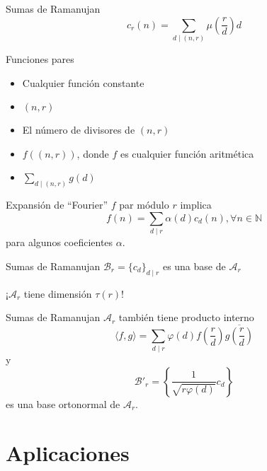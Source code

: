 \documentclass{beamer}
\begin{document}
\begin{frame}{Sumas de Ramanujan}
    \begin{equation*}
        c_r(n) = \sum_{d \mid (n,r)} \mu \left( \frac{r}{d} \right) d
    \end{equation*}
\end{frame}

\begin{frame}{Funciones pares}
    \begin{itemize}
    \item Cualquier función constante
    \item $(n,r)$
    \item El número de divisores de $(n,r)$
    \item $f((n,r))$, donde $f$ es cualquier función aritmética
    \item $\sum_{d \mid (n,r)} g(d)$
    \end{itemize}
\end{frame}

\begin{frame}{Expansión de ``Fourier''}
    $f$ par módulo $r$ implica
    \begin{equation*}
        f(n) = \sum_{d \mid r} \alpha(d) c_d(n), \forall n \in \mathbb{N}
    \end{equation*}
    para algunos coeficientes $\alpha$.
\end{frame}

\begin{frame}{Sumas de Ramanujan}
    \centering
    $\mathcal{B}_r = \{ c_d \}_{d \mid r}$ es una base de $\mathcal{A}_r$

    ¡$\mathcal{A}_r$ tiene dimensión $\tau(r)$!
\end{frame}

\begin{frame}{Sumas de Ramanujan}
    $\mathcal{A}_r$ también tiene producto interno
    \begin{equation*}
        \langle f, g \rangle = \sum_{d \mid r} \varphi(d) f \left( \frac{r}{d} \right) \overline{g \left( \frac{r}{d} \right)}
    \end{equation*}
    y
    \begin{equation*}
        \mathcal{B}'_r = \left\{ \frac{1}{\sqrt{r \varphi(d)}} c_d \right\}
    \end{equation*}
    es una base ortonormal de $\mathcal{A}_r$.
\end{frame}

\section{Aplicaciones}
\end{document}
